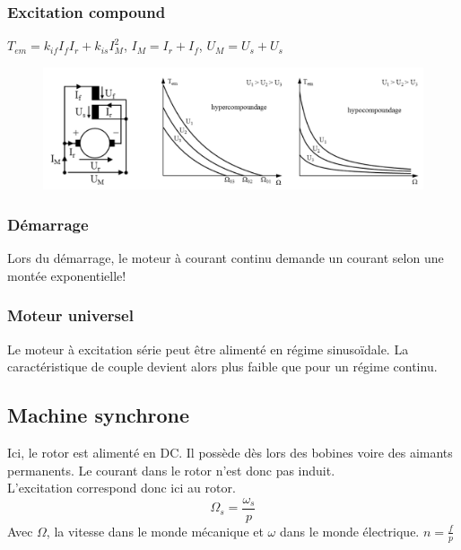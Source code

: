 \documentclass[../main.tex]{subfiles}
\begin{document}
\subsubsection{Excitation compound}
$T_{em} = k_{if} I_f I_r + k_{is} I_M^2$, $I_M = I_r+I_f$, $U_M = U_s+U_s$\\

\begin{figure}[hbt!]
    \centering
    \includegraphics[width=.8\textwidth]{IMAGES/elec/mcompound.png}
\end{figure}

\subsubsection{Démarrage}
Lors du démarrage, le moteur à courant continu demande un courant selon une montée exponentielle!\\

\subsubsection{Moteur universel}
Le moteur à excitation série peut être alimenté en régime sinusoïdale. La caractéristique de couple devient alors plus faible que pour un régime continu.\\

\subsection{Machine synchrone}

Ici, le rotor est alimenté en DC. Il possède dès lors des bobines voire des aimants permanents. Le courant dans le rotor n'est donc pas induit.\\
L'excitation correspond donc ici au rotor.\\

\begin{equation}
    \Omega_s = \frac{\omega_s}{p}
\end{equation}
Avec $\Omega$, la vitesse dans le monde mécanique et $\omega$ dans le monde électrique. $n = \frac{f}{p}$\\
\end{document}
